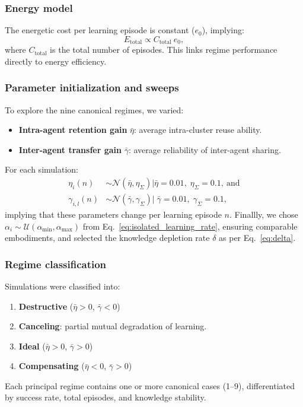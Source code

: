 \subsubsection{Energy model}
The energetic cost per learning episode is constant ($e_0$), implying:
\begin{equation*}
    E_\mathrm{total} \propto C_\mathrm{total} \: e_0,
\end{equation*}
where $C_\mathrm{total}$ is the total number of episodes. This links regime performance directly to energy efficiency.

\subsubsection{Parameter initialization and sweeps}
To explore the nine canonical regimes, we varied:
\begin{itemize}
    \item \textbf{Intra-agent retention gain} $\bar{\eta}$: average intra-cluster reuse ability.
    \item \textbf{Inter-agent transfer gain} $\bar{\gamma}$: average reliability of inter-agent sharing.
\end{itemize}
For each simulation:
\begin{align*}
    \eta_i(n) &\sim \mathcal{N}(\bar{\eta}, \eta_{\Sigma}) \lvert \bar{\eta} = 0.01, \; \eta_{\Sigma} = 0.1,~\text{and}\\
    \gamma_{i,l}(n) &\sim \mathcal{N}(\bar{\gamma}, \gamma_{\Sigma})|\; \bar{\gamma} = 0.01, \; \gamma_{\Sigma} = 0.1,
\end{align*}
implying that these parameters change per learning episode $n$. Finallly, we chose $\alpha_i \sim \mathcal{U}(\alpha_\mathrm{min}, \alpha_\mathrm{max})$ from Eq.~\eqref{eq:isolated_learning_rate}, ensuring comparable embodiments, and selected the knowledge depletion rate $\delta$ as per Eq.~\eqref{eq:delta}.

\subsubsection{Regime classification}
Simulations were classified into:
\begin{enumerate}
    \item \textbf{Destructive} ($\bar{\eta} > 0$, $\bar{\gamma} < 0$)
    \item \textbf{Canceling}: partial mutual degradation of learning.
    \item \textbf{Ideal} ($\bar{\eta} > 0$, $\bar{\gamma} > 0$)
    \item \textbf{Compensating} ($\bar{\eta} < 0$, $\bar{\gamma} > 0$)
\end{enumerate}
Each principal regime contains one or more canonical cases (1–9), differentiated by success rate, total episodes, and knowledge stability.

